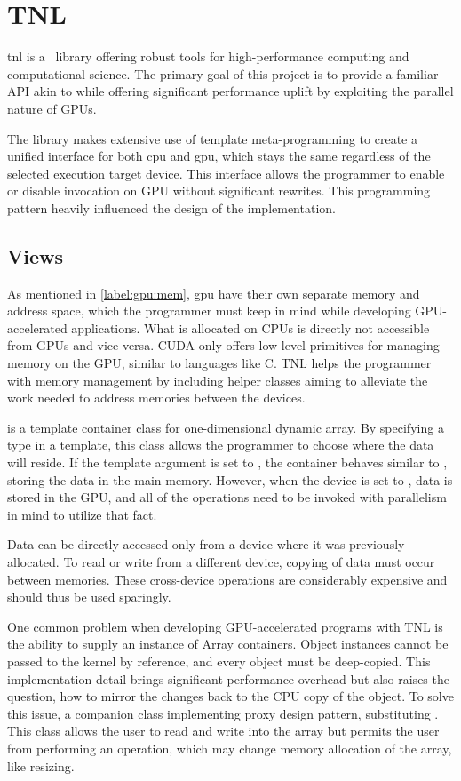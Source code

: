 \section{TNL}

\acrfull{tnl} \cite{tnl} is a \CC\ library offering robust tools for high-performance computing and computational science. The primary goal of this project is to provide a familiar API akin to  while offering significant performance uplift by exploiting the parallel nature of GPUs.

The library makes extensive use of template meta-programming to create a unified interface for both \acrshort{cpu} and \acrshort{gpu}, which stays the same regardless of the selected execution target device. This interface allows the programmer to enable or disable invocation on GPU without significant rewrites. This programming pattern heavily influenced the design of the implementation.

\subsection{Views}

As mentioned in \cref{label:gpu:mem}, \acrshort{gpu} have their own separate memory and address space, which the programmer must keep in mind while developing GPU-accelerated applications. What is allocated on CPUs is directly not accessible from GPUs and vice-versa. CUDA only offers low-level primitives for managing memory on the GPU, similar to languages like C. TNL helps the programmer with memory management by including helper classes aiming to alleviate the work needed to address memories between the devices.

 is a template container class for one-dimensional dynamic array. By specifying a type in a template, this class allows the programmer to choose where the data will reside. If the template argument is set to , the container behaves similar to , storing the data in the main memory. However, when the device is set to , data is stored in the GPU, and all of the operations need to be invoked with parallelism in mind to utilize that fact.

Data can be directly accessed only from a device where it was previously allocated. To read or write from a different device, copying of data must occur between memories. These cross-device operations are considerably expensive and should thus be used sparingly.

One common problem when developing GPU-accelerated programs with TNL is the ability to supply an instance of Array containers. Object instances cannot be passed to the kernel by reference, and every object must be deep-copied. This implementation detail brings significant performance overhead but also raises the question, how to mirror the changes back to the CPU copy of the object. To solve this issue, a companion class  implementing proxy design pattern, substituting . This class allows the user to read and write into the array but permits the user from performing an operation, which may change memory allocation of the array, like resizing.

